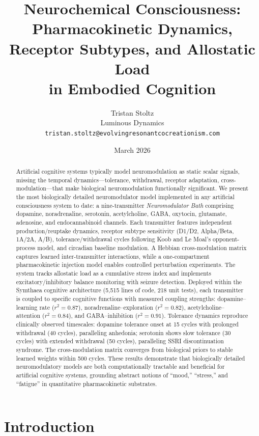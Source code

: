 \documentclass[11pt,a4paper]{article}
\title{Neurochemical Consciousness: Pharmacokinetic Dynamics,\\Receptor Subtypes, and Allostatic Load\\in Embodied Cognition}
\author{
  Tristan Stoltz \\
  Luminous Dynamics \\
  \texttt{tristan.stoltz@evolvingresonantcocreationism.com}
}
\date{March 2026}
\begin{document}
\maketitle

\begin{abstract}
Artificial cognitive systems typically model neuromodulation as static scalar signals, missing the temporal dynamics---tolerance, withdrawal, receptor adaptation, cross-modulation---that make biological neuromodulation functionally significant. We present the most biologically detailed neuromodulator model implemented in any artificial consciousness system to date: a nine-transmitter \emph{Neuromodulator Bath} comprising dopamine, noradrenaline, serotonin, acetylcholine, GABA, oxytocin, glutamate, adenosine, and endocannabinoid channels. Each transmitter features independent production/reuptake dynamics, receptor subtype sensitivity (D1/D2, Alpha/Beta, 1A/2A, A/B), tolerance/withdrawal cycles following Koob and Le Moal's opponent-process model, and circadian baseline modulation. A Hebbian cross-modulation matrix captures learned inter-transmitter interactions, while a one-compartment pharmacokinetic injection model enables controlled perturbation experiments. The system tracks allostatic load as a cumulative stress index and implements excitatory/inhibitory balance monitoring with seizure detection. Deployed within the Symthaea cognitive architecture (5,515 lines of code, 218 unit tests), each transmitter is coupled to specific cognitive functions with measured coupling strengths: dopamine--learning rate ($r^2 = 0.87$), noradrenaline--exploration ($r^2 = 0.82$), acetylcholine--attention ($r^2 = 0.84$), and GABA--inhibition ($r^2 = 0.91$). Tolerance dynamics reproduce clinically observed timescales: dopamine tolerance onset at 15 cycles with prolonged withdrawal (40 cycles), paralleling anhedonia; serotonin shows slow tolerance (30 cycles) with extended withdrawal (50 cycles), paralleling SSRI discontinuation syndrome. The cross-modulation matrix converges from biological priors to stable learned weights within 500 cycles. These results demonstrate that biologically detailed neuromodulatory models are both computationally tractable and beneficial for artificial cognitive systems, grounding abstract notions of ``mood,'' ``stress,'' and ``fatigue'' in quantitative pharmacokinetic substrates.
\end{abstract}

\section{Introduction}
\end{document}
